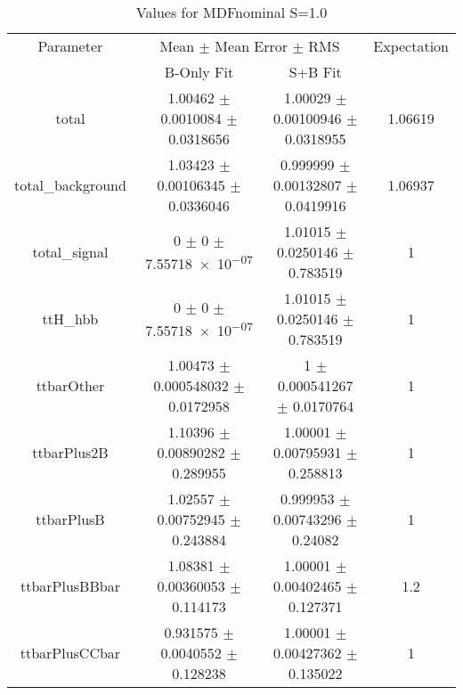 \begin{table}
\centering
\caption{Values for MDFnominal S=1.0}
\begin{tabular}{cccc}
\toprule
Parameter & \multicolumn{2}{c}{Mean $\pm$ Mean Error $\pm$ RMS} & Expectation\\
 & B-Only Fit & S+B Fit & \\
\midrule
total & \num{1.00462} $\pm$ \num{0.0010084} $\pm$ \num{0.0318656} & \num{1.00029} $\pm$ \num{0.00100946} $\pm$ \num{0.0318955} & \num{1.06619}\\
total\_background & \num{1.03423} $\pm$ \num{0.00106345} $\pm$ \num{0.0336046} & \num{0.999999} $\pm$ \num{0.00132807} $\pm$ \num{0.0419916} & \num{1.06937}\\
total\_signal & \num{0} $\pm$ \num{0} $\pm$ \num{7.55718e-07} & \num{1.01015} $\pm$ \num{0.0250146} $\pm$ \num{0.783519} & \num{1}\\
ttH\_hbb & \num{0} $\pm$ \num{0} $\pm$ \num{7.55718e-07} & \num{1.01015} $\pm$ \num{0.0250146} $\pm$ \num{0.783519} & \num{1}\\
ttbarOther & \num{1.00473} $\pm$ \num{0.000548032} $\pm$ \num{0.0172958} & \num{1} $\pm$ \num{0.000541267} $\pm$ \num{0.0170764} & \num{1}\\
ttbarPlus2B & \num{1.10396} $\pm$ \num{0.00890282} $\pm$ \num{0.289955} & \num{1.00001} $\pm$ \num{0.00795931} $\pm$ \num{0.258813} & \num{1}\\
ttbarPlusB & \num{1.02557} $\pm$ \num{0.00752945} $\pm$ \num{0.243884} & \num{0.999953} $\pm$ \num{0.00743296} $\pm$ \num{0.24082} & \num{1}\\
ttbarPlusBBbar & \num{1.08381} $\pm$ \num{0.00360053} $\pm$ \num{0.114173} & \num{1.00001} $\pm$ \num{0.00402465} $\pm$ \num{0.127371} & \num{1.2}\\
ttbarPlusCCbar & \num{0.931575} $\pm$ \num{0.0040552} $\pm$ \num{0.128238} & \num{1.00001} $\pm$ \num{0.00427362} $\pm$ \num{0.135022} & \num{1}\\
\bottomrule
\end{tabular}
\end{table}